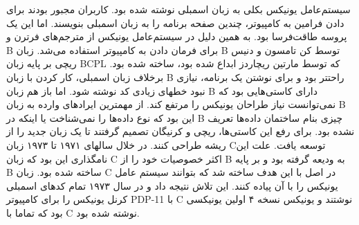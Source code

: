 سیستم‌عامل یونیکس بکلی به زبان اسمبلی نوشته شده بود. کاربران مجبور بودند برای دادن فرامین به کامپیوتر، چندین صفحه برنامه را به زبان اسمبلی بنویسند. اما این یک پروسه طاقت‌فرسا بود. به همین دلیل در سیستم‌عامل یونیکس از مترجم‌های فرترن و B برای فرمان دادن به کامپیوتر استفاده می‌شد. زبان B توسط کن تامسون و دنیس ریچی بر پایه زبان BCPL که توسط مارتین ریچاردز ابداع شده بود، ساخته شده بود. برخلاف زبان اسمبلی، کار کردن با زبان B راحتتر بود و برای نوشتن یک برنامه، نیازی نبود خطهای زیادی کد نوشته شود. اما باز هم زبان B دارای کاستی‌هایی بود که نمی‌توانست نیاز طراحان یونیکس را مرتفع کند. از مهمترین ایرادهای وارده به زبان B این بود که نوع داده‌ها را نمی‌شناخت یا اینکه در B چیزی بنام ساختمان داده‌ها تعریف نشده بود. برای رفع این کاستی‌ها، ریچی و کرنیگان تصمیم گرفتند تا یک زبان جدید را از ریشه طراحی کنند. در خلال سالهای ۱۹۷۱ تا ۱۹۷۳ زبان Cتوسعه یافت. علت این نامگذاری این بود که زبان C اکثر خصوصیات خود را از B به ودیعه گرفته بود و بر پایه B ساخته شده بود. زبان C در اصل با این هدف ساخته شد که بتوانند سیستم عامل یونیکس را با آن پیاده کنند. این تلاش نتیجه داد و در سال ۱۹۷۳ تمام کدهای اسمبلی کرنل یونیکس را برای کامپیوتر PDP-11 با C نوشتند و یونیکس نسخه ۴ اولین یونیکسی بود که تماما با C نوشته شده بود.